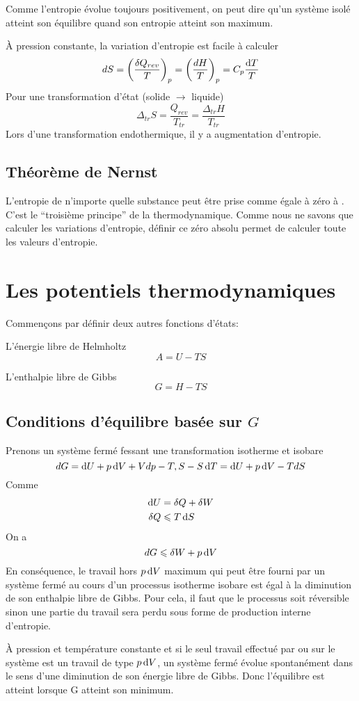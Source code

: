 Comme l'entropie évolue toujours positivement,
on peut dire qu'un système isolé atteint son équilibre
quand son entropie atteint son maximum.

À pression constante, la variation d'entropie est facile à calculer
\[ dS = \left(\frac{\delta Q_{rev}}{T}\right)_p =
\left(\frac{dH}{T}\right)_p = C_p\frac{\operatorname{d}\! T}{T} \]
Pour une transformation d'état (solide $\longrightarrow$ liquide)
\[ \Delta_{tr}S = \frac{Q_{rev}}{T_{tr}} = \frac{\Delta_{tr}H}{T_{tr}} \]
Lors d'une transformation endothermique, il y a augmentation d'entropie.

\subsection{Théorème de Nernst}
L'entropie de n'importe quelle substance peut être prise
comme égale à zéro à .
C'est le ``troisième principe'' de la thermodynamique.
Comme nous ne savons que calculer les variations d'entropie,
définir ce zéro absolu permet de calculer toute les valeurs d'entropie.

\section{Les potentiels thermodynamiques}
Commençons par définir deux autres fonctions d'états:

L'énergie libre de Helmholtz
\[ A = U-TS \]

L'enthalpie libre de Gibbs
\[ G = H-TS \]

\subsection{Conditions d'équilibre basée sur $G$}
Prenons un système fermé fessant une transformation isotherme et isobare
\[ dG = \operatorname{d}\! U+p\operatorname{d}\! V+Vdp-T,S-S\operatorname{d}\! T = \operatorname{d}\! U+p\operatorname{d}\! V-TdS \]
Comme
\begin{align*}
\operatorname{d}\! U & = \delta Q+\delta W\\
\delta Q & \leqslant T\operatorname{d}\! S
\end{align*}
On a
\[ dG \leqslant \delta W + p\operatorname{d}\! V \]
En conséquence, le travail hors $p\operatorname{d}\! V$ maximum qui peut être fourni
par un système fermé au cours d'un processus isotherme isobare est égal
à la diminution de son enthalpie libre de Gibbs.
Pour cela, il faut que le processus soit réversible sinon une partie
du travail sera perdu sous forme de production interne d'entropie.

À pression et température constante et si le seul travail effectué par
ou sur le système est un travail de type $p\operatorname{d}\! V$,
un système fermé évolue spontanément dans le sens
d'une diminution de son énergie libre de Gibbs.
Donc l'équilibre est atteint lorsque G atteint son minimum.

